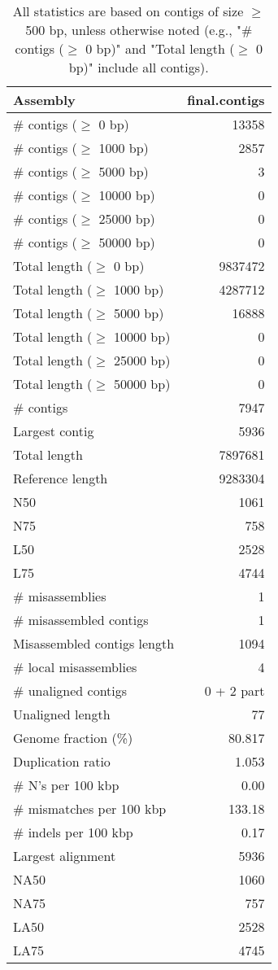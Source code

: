 \documentclass[12pt,a4paper]{article}
\begin{document}
\begin{table}[ht]
\begin{center}
\caption{All statistics are based on contigs of size $\geq$ 500 bp, unless otherwise noted (e.g., "\# contigs ($\geq$ 0 bp)" and "Total length ($\geq$ 0 bp)" include all contigs).}
\begin{tabular}{|l*{1}{|r}|}
\hline
Assembly & final.contigs \\ \hline
\# contigs ($\geq$ 0 bp) & 13358 \\ \hline
\# contigs ($\geq$ 1000 bp) & 2857 \\ \hline
\# contigs ($\geq$ 5000 bp) & 3 \\ \hline
\# contigs ($\geq$ 10000 bp) & 0 \\ \hline
\# contigs ($\geq$ 25000 bp) & 0 \\ \hline
\# contigs ($\geq$ 50000 bp) & 0 \\ \hline
Total length ($\geq$ 0 bp) & 9837472 \\ \hline
Total length ($\geq$ 1000 bp) & 4287712 \\ \hline
Total length ($\geq$ 5000 bp) & 16888 \\ \hline
Total length ($\geq$ 10000 bp) & 0 \\ \hline
Total length ($\geq$ 25000 bp) & 0 \\ \hline
Total length ($\geq$ 50000 bp) & 0 \\ \hline
\# contigs & 7947 \\ \hline
Largest contig & 5936 \\ \hline
Total length & 7897681 \\ \hline
Reference length & 9283304 \\ \hline
N50 & 1061 \\ \hline
N75 & 758 \\ \hline
L50 & 2528 \\ \hline
L75 & 4744 \\ \hline
\# misassemblies & 1 \\ \hline
\# misassembled contigs & 1 \\ \hline
Misassembled contigs length & 1094 \\ \hline
\# local misassemblies & 4 \\ \hline
\# unaligned contigs & 0 + 2 part \\ \hline
Unaligned length & 77 \\ \hline
Genome fraction (\%) & 80.817 \\ \hline
Duplication ratio & 1.053 \\ \hline
\# N's per 100 kbp & 0.00 \\ \hline
\# mismatches per 100 kbp & 133.18 \\ \hline
\# indels per 100 kbp & 0.17 \\ \hline
Largest alignment & 5936 \\ \hline
NA50 & 1060 \\ \hline
NA75 & 757 \\ \hline
LA50 & 2528 \\ \hline
LA75 & 4745 \\ \hline
\end{tabular}
\end{center}
\end{table}
\end{document}
